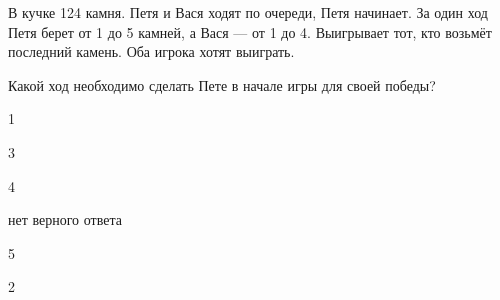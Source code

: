 
\begin{question}
В кучке 124 камня. Петя и Вася ходят по очереди, Петя начинает. За один
ход Петя берет от 1 до 5 камней, а Вася --- от 1 до 4. Выигрывает тот,
кто возьмёт последний камень. Оба игрока хотят выиграть.

Какой ход необходимо сделать Пете в начале игры для своей победы?
\begin{answerlist}
  \item 1
  \item 3
  \item 4
  \item нет верного ответа
  \item 5
  \item 2
\end{answerlist}
\end{question}


